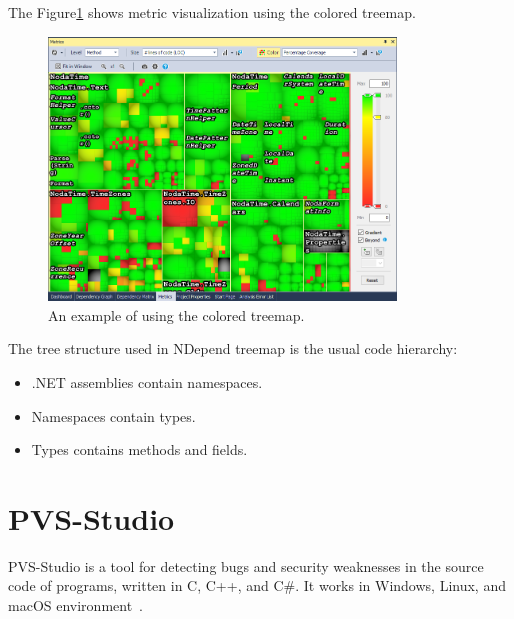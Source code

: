 The Figure\ref{fig:tree} shows metric visualization using the colored treemap.

\begin{figure}[h]
	\centering
	\includegraphics[height=70mm]{figures/tree.png}
	\caption{An example of using the colored treemap.}
	\label{fig:tree}
\end{figure}

The tree structure used in NDepend treemap is the usual code hierarchy: 

\begin{itemize}
	\item .NET assemblies contain namespaces.
	\item Namespaces contain types.
	\item Types contains methods and fields.
\end{itemize}

\section{PVS-Studio}

PVS-Studio is a tool for detecting bugs and security weaknesses in the source code of programs, written in C, C++, and C\#. It works in Windows, Linux, and macOS environment~\cite{pvs}.